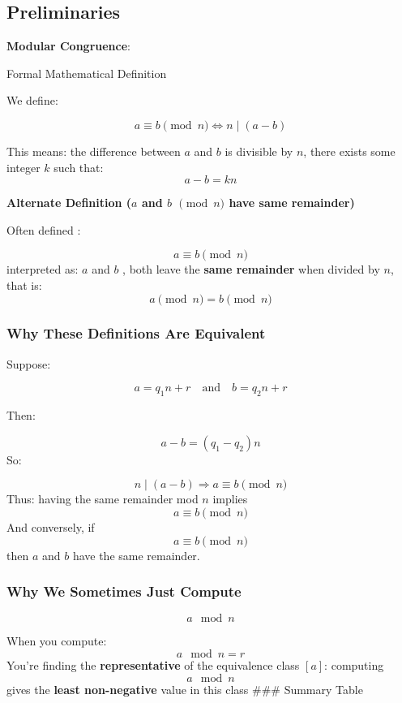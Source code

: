 \documentclass[
]{article}
\begin{document}
\subsection{Preliminaries}\label{preliminaries}

\textbf{Modular Congruence}:

Formal Mathematical Definition

We define:

\[a \equiv b \pmod{n} \iff n \mid (a - b)\]

This means: the difference between \(a\) and \(b\) is divisible by
\(n\), there exists some integer \(k\) such that: \[ a - b = kn\]

\textbf{Alternate Definition (\(a\) and \(b\) \(\pmod n\) have same
remainder)}

Often defined :

\[a \equiv b \pmod{n}\] interpreted as: \(a\) and \(b\) , both leave the
\textbf{same remainder} when divided by \(n\), that is: \[
a \pmod{n} = b \pmod{n}
\]

\subsubsection{Why These Definitions Are
Equivalent}\label{why-these-definitions-are-equivalent}

Suppose:

\[a = q_1 n + r \quad \text{and} \quad b = q_2 n + r\]

Then:

\[a - b = (q_1 - q_2)n\] So:

\[n \mid (a - b) \Rightarrow a \equiv b \pmod{n}\] Thus: having the same
remainder mod \(n\) implies \[a \equiv b \pmod{n}\] And conversely, if
\[a \equiv b \pmod{n}\]then \(a\) and \(b\) have the same remainder.

\subsubsection{Why We Sometimes Just
Compute}\label{why-we-sometimes-just-compute}

\[a \mod n\]

When you compute: \[a \mod n = r\] You're finding the
\textbf{representative} of the equivalence class \([a]\): computing
\[a \mod n\]gives the \textbf{least non-negative} value in this class
\#\#\# Summary Table
\end{document}
